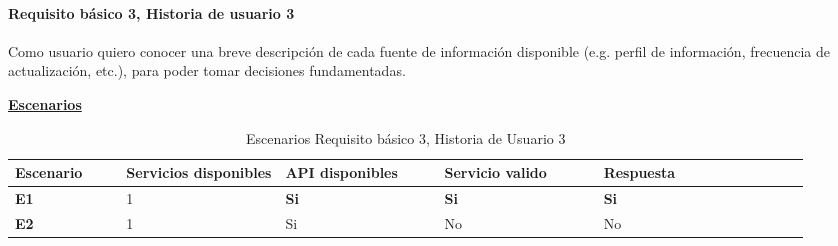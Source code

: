 \documentclass[../ei103948-project-documentation.tex]{subfiles}
\begin{document}
					\testBasicoV

					\vspace*{5mm}


				\paragraph{Requisito básico 3, Historia de usuario 3}
				Como usuario quiero conocer una breve descripción de cada fuente de información disponible (e.g. perfil de información, frecuencia de actualización, etc.), para poder tomar decisiones fundamentadas.
	
					\begin{center}
						\textbf{\underline{Escenarios}}
						\begin{table}[H]
							\centering
							\begin{tabular}{|p{0.14\linewidth}|p{0.20\linewidth}|p{0.20\linewidth}|p{0.20\linewidth}|p{0.12\linewidth}|p{0.12\linewidth}|p{0.12\linewidth}|}
								\hline
								\textbf{Escenario} & \textbf{Servicios disponibles} & \textbf{API disponibles} & \textbf{Servicio valido} & \textbf{Respuesta} \\ \hline
								\textbf{E1}        & 1                              & \textbf{Si}              & \textbf{Si}              & \textbf{Si}        \\ \hline
								\textbf{E2}        & 1                              & Si                       & No                       & No                 \\ \hline
								\end{tabular}
							\caption{Escenarios Requisito básico 3, Historia de Usuario 3}
						\end{table}

						\descripcionBasicaW
	

\end{center}
\end{document}

